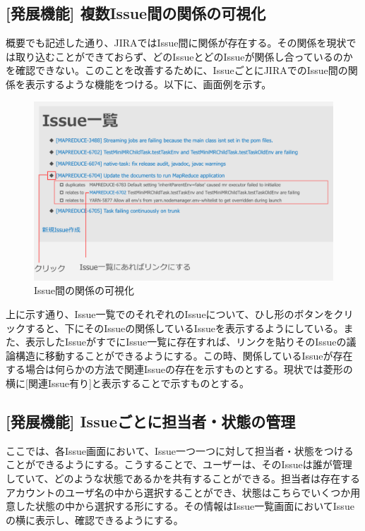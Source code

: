 \documentclass[12pt, oneside]{jreport}
\begin{document}
		\subsection{[発展機能] 複数Issue間の関係の可視化}
		概要でも記述した通り、JIRAではIssue間に関係が存在する。その関係を現状では取り込むことができておらず、どのIssueとどのIssueが関係し合っているのかを確認できない。このことを改善するために、IssueごとにJIRAでのIssue間の関係を表示するような機能をつける。以下に、画面例を示す。
		
		\begin{figure}[H]
		\centering
		\includegraphics[width=17cm,bb=300 300 -200 27]{RelatesVisualize.png}
		\caption{Issue間の関係の可視化}
		\end{figure}
		
		上に示す通り、Issue一覧でのそれぞれのIssueについて、ひし形のボタンをクリックすると、下にそのIssueの関係しているIssueを表示するようにしている。また、表示したIssueがすでにIssue一覧に存在すれば、リンクを貼りそのIssueの議論構造に移動することができるようにする。この時、関係しているIssueが存在する場合は何らかの方法で関連Issueの存在を示すものとする。現状では菱形の横に[関連Issue有り]と表示することで示すものとする。

		\subsection{[発展機能] Issueごとに担当者・状態の管理}
		ここでは、各Issue画面において、Issue一つ一つに対して担当者・状態をつけることができるようにする。こうすることで、ユーザーは、そのIssueは誰が管理していて、どのような状態であるかを共有することができる。担当者は存在するアカウントのユーザ名の中から選択することができ、状態はこちらでいくつか用意した状態の中から選択する形にする。その情報はIssue一覧画面においてIssueの横に表示し、確認できるようにする。
		
\end{document}
